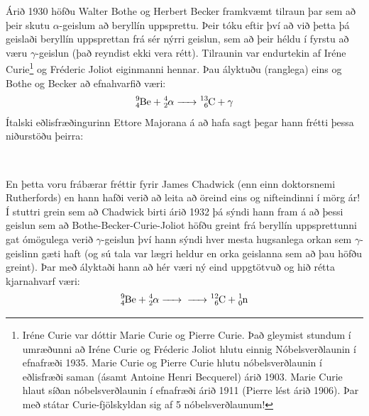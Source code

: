 \ifdefined \wholebook \else\documentclass[oneside]{book}\usepackage{EdlBook}\graphicspath{{figures/}}
\begin{document}
Árið 1930 höfðu Walter Bothe og Herbert Becker framkvæmt tilraun þar sem að þeir skutu $\alpha$-geislum að beryllín uppsprettu. Þeir tóku eftir því að við þetta þá geislaði beryllín uppsprettan frá sér nýrri geislun, sem að þeir héldu í fyrstu að væru $\gamma$-geislun (það reyndist ekki vera rétt). Tilraunin var endurtekin af Iréne Curie\footnote{Iréne Curie var dóttir Marie Curie og Pierre Curie. Það gleymist stundum í umræðunni að Iréne Curie og Fréderic Joliot hlutu einnig Nóbelsverðlaunin í efnafræði 1935. Marie Curie og Pierre Curie hlutu nóbelsverðlaunin í eðlisfræði saman (ásamt Antoine Henri Becquerel) árið 1903. Marie Curie hlaut síðan nóbelsverðlaunin í efnafræði árið 1911 (Pierre lést árið 1906). Þar með státar Curie-fjölskyldan sig af 5 nóbelsverðlaunum!} og Fréderic Joliot eiginmanni hennar. Þau ályktuðu (ranglega) eins og Bothe og Becker að efnahvarfið væri:
\begin{align*}
    \ce{^{9}_{4}Be + ^{4}_{2}$\alpha$ -> ^{13}_{6}C + $\gamma$}
\end{align*}
Ítalski eðlisfræðingurinn Ettore Majorana á að hafa sagt þegar hann frétti þessa niðurstöðu þeirra:

\begin{tcolorbox}

 \\

\vspace{-0.3cm}
\end{tcolorbox}


En þetta voru frábærar fréttir fyrir James Chadwick (enn einn doktorsnemi Rutherfords) en hann hafði verið að leita að öreind eins og nifteindinni í mörg ár! Í stuttri grein sem að Chadwick birti árið 1932 þá sýndi hann fram á að þessi geislun sem að Bothe-Becker-Curie-Joliot höfðu greint frá beryllín uppsprettunni gat ómögulega verið $\gamma$-geislun því hann sýndi hver mesta hugsanlega orkan sem $\gamma$-geislinn gæti haft (og sú tala var lægri heldur en orka geislanna sem að þau höfðu greint). Þar með ályktaði hann að hér væri ný eind uppgtötvuð og hið rétta kjarnahvarf væri:
\begin{align*}
    \ce{^{9}_{4}Be + ^{4}_{2}$\alpha$ -> -> ^{12}_{6}C + ^{1}_{0}n}
\end{align*}
\end{document}
